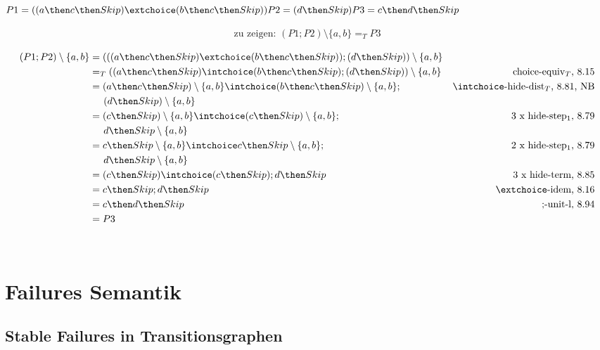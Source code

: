 \documentclass{scrreprt}
\begin{document}
$
P1 = ((a \then c \then Skip) \extchoice (b \then c \then Skip))\\
P2 = (d \then Skip)\\
P3 = c \then d \then Skip
$

\begin{align*}
  \text{zu zeigen: } (P1; P2) \setminus \{a,b\} =_T P3
\end{align*}

\begin{align*}
  (P1; P2) \setminus \{a,b\} &= (((a \then c \then Skip) \extchoice (b \then c \then Skip)); (d \then Skip)) \setminus \{a,b\}& \\
         &=_T ((a \then c \then Skip) \intchoice (b \then c \then Skip); (d \then Skip)) \setminus \{a,b\} &\text{choice-equiv$_T$, 8.15}\\
         &= (a \then c \then Skip) \setminus \{a,b\} \intchoice (b \then c \then Skip) \setminus \{a,b\}; &\intchoice\text{-hide-dist$_T$, 8.81, NB}\\
         &\hspace{0.5cm}(d \then Skip) \setminus \{a,b\}\\
         &=(c \then Skip) \setminus \{a,b\} \intchoice (c \then Skip) \setminus \{a,b\}; &\text{3 x hide-step$_1$, 8.79}\\
         &\hspace{0.5cm} d \then Skip \setminus \{a,b\}\\
         &=c \then Skip \setminus \{a,b\} \intchoice c \then Skip \setminus \{a,b\}; &\text{2 x hide-step$_1$, 8.79}\\
         &\hspace{0.5cm} d \then Skip \setminus \{a,b\}\\
         &= (c \then Skip) \intchoice (c \then Skip); d \then Skip &\text{3 x hide-term, 8.85}\\
         &= c \then Skip; d \then Skip & \extchoice\text{-idem, 8.16}\\
         &= c \then d \then Skip & \text{;-unit-l, 8.94}\\
         &= P3
\end{align*}

\flushright{\qedsymbol}\\

\chapter{Failures Semantik}

\section{Stable Failures in Transitionsgraphen}
\end{document}
